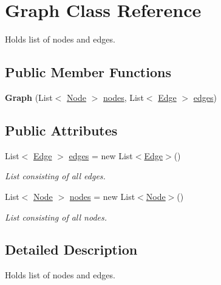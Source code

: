 \hypertarget{class_graph}{}\section{Graph Class Reference}
\label{class_graph}


Holds list of nodes and edges.  


\subsection*{Public Member Functions}
\begin{DoxyCompactItemize}
\item 
\mbox{\label{class_graph_a4a67baa48ef20f9fdbd80b0b7e5788d2}} 
{\bfseries Graph} (List$<$ \mbox{\hyperlink{class_node}{Node}} $>$ \mbox{\hyperlink{class_graph_a5ecc9c1538b1c81f615e5cfd12f29816}{nodes}}, List$<$ \mbox{\hyperlink{class_edge}{Edge}} $>$ \mbox{\hyperlink{class_graph_a4647d3fa90942e128f3f4612a4838c23}{edges}})
\end{DoxyCompactItemize}
\subsection*{Public Attributes}
\begin{DoxyCompactItemize}
\item 
List$<$ \mbox{\hyperlink{class_edge}{Edge}} $>$ \mbox{\hyperlink{class_graph_a4647d3fa90942e128f3f4612a4838c23}{edges}} = new List$<$\mbox{\hyperlink{class_edge}{Edge}}$>$()
\begin{DoxyCompactList}\small\item\em List consisting of all edges. \end{DoxyCompactList}\item 
List$<$ \mbox{\hyperlink{class_node}{Node}} $>$ \mbox{\hyperlink{class_graph_a5ecc9c1538b1c81f615e5cfd12f29816}{nodes}} = new List$<$\mbox{\hyperlink{class_node}{Node}}$>$()
\begin{DoxyCompactList}\small\item\em List consisting of all nodes. \end{DoxyCompactList}\end{DoxyCompactItemize}


\subsection{Detailed Description}
Holds list of nodes and edges. 



